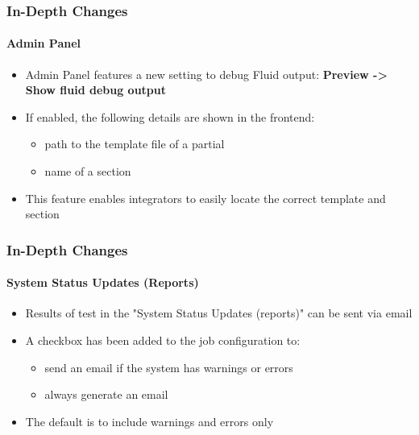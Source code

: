 \begin{frame}[fragile]
	\frametitle{In-Depth Changes}
	\framesubtitle{Admin Panel}

	\begin{itemize}
		\item Admin Panel features a new setting to debug Fluid output:\newline
			\textbf{Preview -> Show fluid debug output}
		\item If enabled, the following details are shown in the frontend:

			\begin{itemize}
				\item path to the template file of a partial
				\item name of a section
			\end{itemize}

		\item This feature enables integrators to easily locate the correct template and section

	\end{itemize}

\end{frame}






\begin{frame}[fragile]
	\frametitle{In-Depth Changes}
	\framesubtitle{System Status Updates (Reports)}

	\begin{itemize}
		\item Results of test in the "System Status Updates (reports)" can be sent via email
		\item A checkbox has been added to the job configuration to:

			\begin{itemize}
				\item send an email if the system has warnings or errors
				\item always generate an email
			\end{itemize}

		\item The default is to include warnings and errors only

	\end{itemize}

\end{frame}







